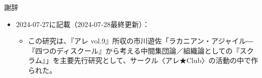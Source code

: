 謝辞

\begin{itemize}
\tightlist
\item
  2024-07-27に記載（2024-07-28最終更新）：

  \begin{itemize}
  \tightlist
  \item
    この研究は、『アレ
    vol.9』所収の市川遊佐「ラカニアン・アジャイル―『四つのディスクール』から考える中間集団論／組織論としての『スクラム』」を主要先行研究として、サークル〈アレ★Club〉の活動の中で作られた。
  \end{itemize}
\end{itemize}
